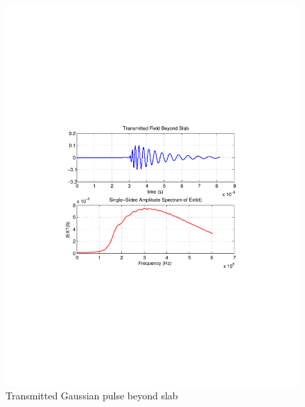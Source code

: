 \documentclass{article}
\begin{document}
\begin{figure}[t!]
\centering
\includegraphics[scale=0.55, trim=3.5cm 8.7cm 4.5cm 8.85cm, clip]{Figures/FigCh03_TransmittedFieldBeyondSlab.pdf}
\caption{Transmitted Gaussian pulse beyond slab}
\label{1DDNG-Transmitted-Gaussian-Pulse-Beyond-Slab}
\end{figure}
\end{document}

